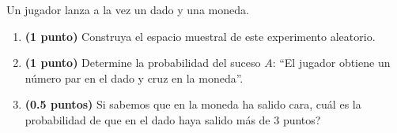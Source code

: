
Un jugador lanza a la vez un dado y una moneda.
\begin{enumerate}[label=\alph*)]
\item \textbf{(1 punto)} Construya el espacio muestral de este experimento aleatorio.
\item \textbf{(1 punto)} Determine la probabilidad del suceso $A$: ``El jugador obtiene un número par en el dado y cruz en la moneda''.
\item \textbf{(0.5 puntos)} Si sabemos que en la moneda ha salido cara, \textquestiondown{}cuál es la probabilidad de que en el dado haya salido más de 3 puntos?
\end{enumerate}
